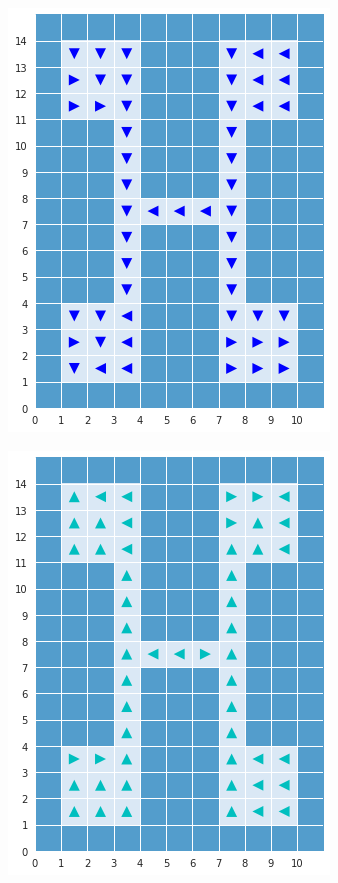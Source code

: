 \documentclass{article} %
\begin{document}
\begin{figure}[t]
    \centering
    \begin{subfigure}{0.24\columnwidth}
    \centering
    \includegraphics[scale=0.2]{figures/c2.png}
    \caption{}
    \end{subfigure}%
    \centering
    \begin{subfigure}{0.24\columnwidth}
    \centering
    \includegraphics[scale=0.2]{figures/c3.png}

\end{subfigure}
\end{figure}
\end{document}
